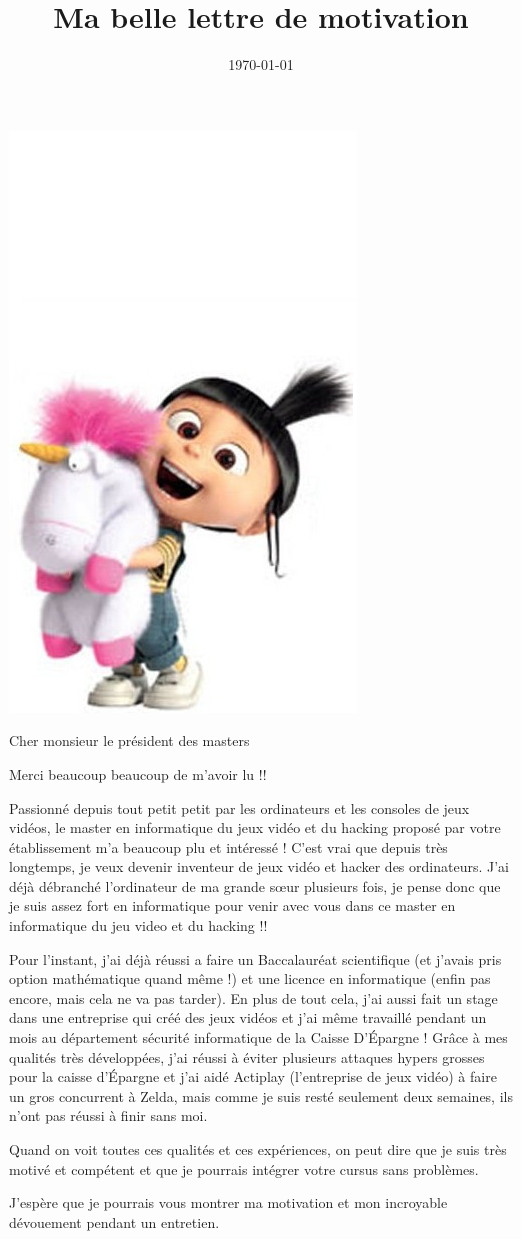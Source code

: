 \documentclass[11pt,a4paper,sans]{moderncv}
\title{Ma belle lettre de motivation}
\begin{document}
\includegraphics[scale=0.2]{profil_picture.jpg}
\date{\today}
\opening{Cher monsieur le pr\'esident des masters}
\closing{Merci beaucoup beaucoup de m'avoir lu !!}
\makelettertitle

Passionn\'e depuis tout petit petit par les ordinateurs et les consoles de jeux vid\'eos, le master en informatique du jeux vid\'eo et du hacking propos\'e par votre \'etablissement m'a beaucoup plu et int\'eress\'e ! C'est vrai que depuis très longtemps, je veux devenir inventeur de jeux vid\'eo et hacker des ordinateurs. J'ai d\'ejà d\'ebranch\'e l'ordinateur de ma grande s\oe{}ur plusieurs fois, je pense donc que je suis assez fort en informatique pour venir avec vous dans ce master en informatique du jeu video et du hacking !!

Pour l'instant, j'ai d\'ejà r\'eussi a faire un Baccalaur\'eat scientifique (et j'avais pris option math\'ematique quand m\^eme !) et une licence en informatique (enfin pas encore, mais cela ne va pas tarder). En plus de tout cela, j'ai aussi fait un stage dans une entreprise qui cr\'e\'e des jeux vid\'eos et j'ai m\^eme travaill\'e pendant un mois au d\'epartement s\'ecurit\'e informatique de la Caisse D'\'Epargne ! Gr\^ace à mes qualit\'es très d\'evelopp\'ees, j'ai r\'eussi à \'eviter plusieurs attaques hypers grosses pour la caisse d'\'Epargne et j'ai aid\'e Actiplay (l'entreprise de jeux vid\'eo) à faire un gros concurrent à Zelda, mais comme je suis rest\'e seulement deux semaines, ils n'ont pas r\'eussi à  finir sans moi.

Quand on voit toutes ces qualit\'es et ces exp\'eriences, on peut dire que je suis très motiv\'e et comp\'etent et que je pourrais int\'egrer votre cursus sans problèmes.

J'espère que je pourrais vous montrer ma motivation et mon incroyable d\'evouement pendant un entretien.

\makeletterclosing
\end{document}
